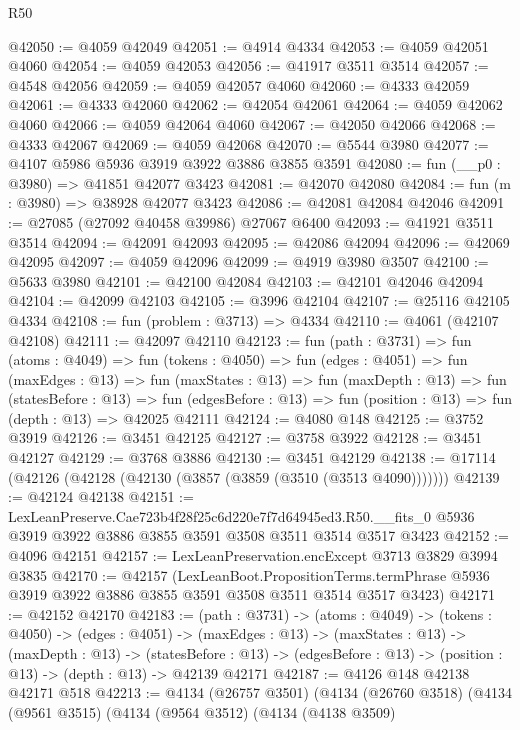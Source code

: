 \begin{lexlean}{R50}
\begin{coremodule}
@42050 := @4059 @42049
@42051 := @4914 @4334
@42053 := @4059 @42051 @4060
@42054 := @4059 @42053
@42056 := @41917 @3511 @3514
@42057 := @4548 @42056
@42059 := @4059 @42057 @4060
@42060 := @4333 @42059
@42061 := @4333 @42060
@42062 := @42054 @42061
@42064 := @4059 @42062 @4060
@42066 := @4059 @42064 @4060
@42067 := @42050 @42066
@42068 := @4333 @42067
@42069 := @4059 @42068
@42070 := @5544 @3980
@42077 := @4107 @5986 @5936 @3919 @3922 @3886 @3855 @3591
@42080 := fun (__p0 : @3980) => @41851 @42077 @3423
@42081 := @42070 @42080
@42084 := fun (m : @3980) => @38928 @42077 @3423
@42086 := @42081 @42084 @42046
@42091 := @27085 (@27092 @40458 @39986) @27067 @6400
@42093 := @41921 @3511 @3514
@42094 := @42091 @42093
@42095 := @42086 @42094
@42096 := @42069 @42095
@42097 := @4059 @42096
@42099 := @4919 @3980 @3507
@42100 := @5633 @3980
@42101 := @42100 @42084
@42103 := @42101 @42046 @42094
@42104 := @42099 @42103
@42105 := @3996 @42104
@42107 := @25116 @42105 @4334
@42108 := fun (problem : @3713) => @4334
@42110 := @4061 (@42107 @42108)
@42111 := @42097 @42110
@42123 := fun (path : @3731) =>
  fun (atoms : @4049) =>
  fun (tokens : @4050) =>
  fun (edges : @4051) =>
  fun (maxEdges : @13) =>
  fun (maxStates : @13) =>
  fun (maxDepth : @13) =>
  fun (statesBefore : @13) =>
  fun (edgesBefore : @13) => fun (position : @13) => fun (depth : @13) => @42025 @42111
@42124 := @4080 @148
@42125 := @3752 @3919
@42126 := @3451 @42125
@42127 := @3758 @3922
@42128 := @3451 @42127
@42129 := @3768 @3886
@42130 := @3451 @42129
@42138 := @17114 (@42126 (@42128 (@42130 (@3857 (@3859 (@3510 (@3513 @4090)))))))
@42139 := @42124 @42138
@42151 := LexLeanPreserve.Cae723b4f28f25c6d220e7f7d64945ed3.R50.__fits_0
    @5936
    @3919
    @3922
    @3886
    @3855
    @3591
    @3508
    @3511
    @3514
    @3517
    @3423
@42152 := @4096 @42151
@42157 := LexLeanPreservation.encExcept @3713 @3829 @3994 @3835
@42170 := @42157
    (LexLeanBoot.PropositionTerms.termPhrase
      @5936
      @3919
      @3922
      @3886
      @3855
      @3591
      @3508
      @3511
      @3514
      @3517
      @3423)
@42171 := @42152 @42170
@42183 := (path : @3731) ->
  (atoms : @4049) ->
  (tokens : @4050) ->
  (edges : @4051) ->
  (maxEdges : @13) ->
  (maxStates : @13) ->
  (maxDepth : @13) ->
  (statesBefore : @13) -> (edgesBefore : @13) -> (position : @13) -> (depth : @13) -> @42139 @42171
@42187 := @4126 @148 @42138 @42171 @518
@42213 := @4134
    (@26757 @3501)
    (@4134
      (@26760 @3518)
      (@4134
        (@9561 @3515)
        (@4134
          (@9564 @3512)
          (@4134
            (@4138 @3509)

\end{coremodule}
\end{lexlean}
